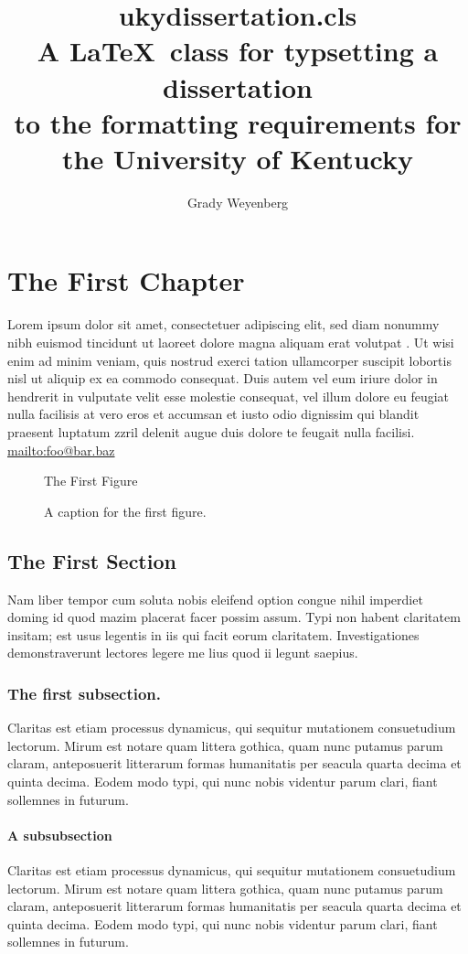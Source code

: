 \documentclass[noendorse]{ukydissertation}
\title{ukydissertation.cls\protect\\%
  A \LaTeX\ class for typsetting a dissertation\protect\\%
  to the formatting requirements for\protect\\%
  the University of Kentucky%
}
\author{Grady Weyenberg}
\begin{document}
\makefrontmatter


\chapter{The First Chapter}
\label{cha:first-chapter}
Lorem ipsum dolor sit amet, consectetuer adipiscing elit, sed diam
nonummy nibh euismod tincidunt ut laoreet dolore magna aliquam erat
volutpat \citep{weyenberg2014nonparametric}. Ut wisi enim ad minim veniam, quis nostrud exerci tation
ullamcorper suscipit lobortis nisl ut aliquip ex ea commodo
consequat. Duis autem vel eum iriure dolor in hendrerit in vulputate
velit esse molestie consequat, vel illum dolore eu feugiat nulla
facilisis at vero eros et accumsan et iusto odio dignissim qui blandit
praesent luptatum zzril delenit augue duis dolore te feugait nulla
facilisi. \url{mailto:foo@bar.baz}
\begin{figure}
  \centering
  The First Figure
  \caption[A name for the ToC]{A caption for the first figure.}
  \label{fig:numberone}
\end{figure}
\section{The First Section}
\label{sec:first-section}

Nam liber tempor cum soluta nobis eleifend option congue
nihil imperdiet doming id quod mazim placerat facer possim assum. Typi
non habent claritatem insitam; est usus legentis in iis qui facit
eorum claritatem. Investigationes demonstraverunt lectores legere me
lius quod ii legunt saepius.
\subsection{The first subsection.}
\label{sec:first-subsection}

Claritas est etiam processus dynamicus,
qui sequitur mutationem consuetudium lectorum. Mirum est notare quam
littera gothica, quam nunc putamus parum claram, anteposuerit
litterarum formas humanitatis per seacula quarta decima et quinta
decima. Eodem modo typi, qui nunc nobis videntur parum clari, fiant
sollemnes in futurum.

\subsubsection{A subsubsection}

Claritas est etiam processus dynamicus,
qui sequitur mutationem consuetudium lectorum. Mirum est notare quam
littera gothica, quam nunc putamus parum claram, anteposuerit
litterarum formas humanitatis per seacula quarta decima et quinta
decima. Eodem modo typi, qui nunc nobis videntur parum clari, fiant
sollemnes in futurum.
\end{document}
